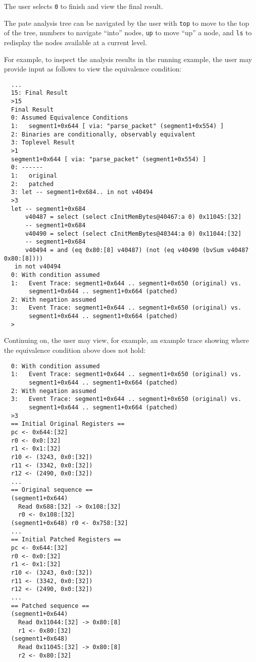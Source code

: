 The user selects \texttt{0} to finish and view the final result.

The pate analysis tree can be navigated by the user with \texttt{top} to move to the top of the tree, numbers to navigate ``into'' nodes, \texttt{up} to move ``up'' a node, and \texttt{ls} to redisplay the nodes available at a current level.

For example, to inspect the analysis results in the running example, the user may provide input as follows to view the equivalence condition:

\begin{verbatim}
  ...
  15: Final Result
  >15
  Final Result
  0: Assumed Equivalence Conditions
  1:   segment1+0x644 [ via: "parse_packet" (segment1+0x554) ]
  2: Binaries are conditionally, observably equivalent
  3: Toplevel Result
  >1
  segment1+0x644 [ via: "parse_packet" (segment1+0x554) ]
  0: ------
  1:   original
  2:   patched
  3: let -- segment1+0x684.. in not v40494
  >3
  let -- segment1+0x684
      v40487 = select (select cInitMemBytes@40467:a 0) 0x11045:[32]
      -- segment1+0x684
      v40490 = select (select cInitMemBytes@40344:a 0) 0x11044:[32]
      -- segment1+0x684
      v40494 = and (eq 0x80:[8] v40487) (not (eq v40490 (bvSum v40487 0x80:[8])))
   in not v40494
  0: With condition assumed
  1:   Event Trace: segment1+0x644 .. segment1+0x650 (original) vs.
       segment1+0x644 .. segment1+0x664 (patched)
  2: With negation assumed
  3:   Event Trace: segment1+0x644 .. segment1+0x650 (original) vs.
       segment1+0x644 .. segment1+0x664 (patched)
  >
\end{verbatim}

Continuing on, the user may view, for example, an example trace showing where the equivalence condition above does not hold:

\begin{verbatim}
  0: With condition assumed
  1:   Event Trace: segment1+0x644 .. segment1+0x650 (original) vs.
       segment1+0x644 .. segment1+0x664 (patched)
  2: With negation assumed
  3:   Event Trace: segment1+0x644 .. segment1+0x650 (original) vs.
       segment1+0x644 .. segment1+0x664 (patched)
  >3
  == Initial Original Registers ==
  pc <- 0x644:[32]
  r0 <- 0x0:[32]
  r1 <- 0x1:[32]
  r10 <- (3243, 0x0:[32])
  r11 <- (3342, 0x0:[32])
  r12 <- (2490, 0x0:[32])
  ...
  == Original sequence ==
  (segment1+0x644)
    Read 0x688:[32] -> 0x108:[32]
    r0 <- 0x108:[32]
  (segment1+0x648) r0 <- 0x758:[32]
  ...
  == Initial Patched Registers ==
  pc <- 0x644:[32]
  r0 <- 0x0:[32]
  r1 <- 0x1:[32]
  r10 <- (3243, 0x0:[32])
  r11 <- (3342, 0x0:[32])
  r12 <- (2490, 0x0:[32])
  ...
  == Patched sequence ==
  (segment1+0x644)
    Read 0x11044:[32] -> 0x80:[8]
    r1 <- 0x80:[32]
  (segment1+0x648)
    Read 0x11045:[32] -> 0x80:[8]
    r2 <- 0x80:[32]
\end{verbatim}

